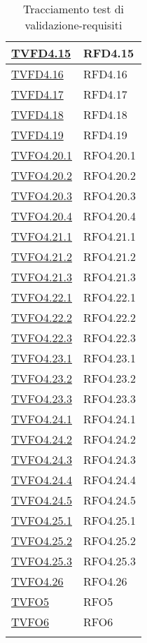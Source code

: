 \begin{longtable}{|>{\centering}m{5cm}|m{5cm}<{\centering}|}
\hyperlink{TVFD4.15}{TVFD4.15} & RFD4.15\\ \hline
\hyperlink{TVFD4.16}{TVFD4.16} & RFD4.16\\ \hline
\hyperlink{TVFD4.17}{TVFD4.17} & RFD4.17\\ \hline
\hyperlink{TVFD4.18}{TVFD4.18} & RFD4.18\\ \hline
\hyperlink{TVFD4.19}{TVFD4.19} & RFD4.19\\ \hline
\hyperlink{TVFO4.20.1}{TVFO4.20.1} & RFO4.20.1\\ \hline
\hyperlink{TVFO4.20.2}{TVFO4.20.2} & RFO4.20.2\\ \hline
\hyperlink{TVFO4.20.3}{TVFO4.20.3} & RFO4.20.3\\ \hline
\hyperlink{TVFO4.20.4}{TVFO4.20.4} & RFO4.20.4\\ \hline
\hyperlink{TVFO4.21.1}{TVFO4.21.1} & RFO4.21.1\\ \hline
\hyperlink{TVFO4.21.2}{TVFO4.21.2} & RFO4.21.2\\ \hline
\hyperlink{TVFO4.21.3}{TVFO4.21.3} & RFO4.21.3\\ \hline
\hyperlink{TVFO4.22.1}{TVFO4.22.1} & RFO4.22.1\\ \hline
\hyperlink{TVFO4.22.2}{TVFO4.22.2} & RFO4.22.2\\ \hline
\hyperlink{TVFO4.22.3}{TVFO4.22.3} & RFO4.22.3\\ \hline
\hyperlink{TVFO4.23.1}{TVFO4.23.1} & RFO4.23.1\\ \hline
\hyperlink{TVFO4.23.2}{TVFO4.23.2} & RFO4.23.2\\ \hline
\hyperlink{TVFO4.23.3}{TVFO4.23.3} & RFO4.23.3\\ \hline
\hyperlink{TVFO4.24.1}{TVFO4.24.1} & RFO4.24.1\\ \hline
\hyperlink{TVFO4.24.2}{TVFO4.24.2} & RFO4.24.2\\ \hline
\hyperlink{TVFO4.24.3}{TVFO4.24.3} & RFO4.24.3\\ \hline
\hyperlink{TVFO4.24.4}{TVFO4.24.4} & RFO4.24.4\\ \hline
\hyperlink{TVFO4.24.5}{TVFO4.24.5} & RFO4.24.5\\ \hline
\hyperlink{TVFO4.25.1}{TVFO4.25.1} & RFO4.25.1\\ \hline
\hyperlink{TVFO4.25.2}{TVFO4.25.2} & RFO4.25.2\\ \hline
\hyperlink{TVFO4.25.3}{TVFO4.25.3} & RFO4.25.3\\ \hline
\hyperlink{TVFO4.26}{TVFO4.26} & RFO4.26\\ \hline
\hyperlink{TVFO5}{TVFO5} & RFO5\\ \hline
\hyperlink{TVFO6}{TVFO6} & RFO6\\ \hline
\caption[Tracciamento test di validazione-requisiti]{Tracciamento test di validazione-requisiti}
\label{tab:tv-requi}
\end{longtable}
\clearpage



